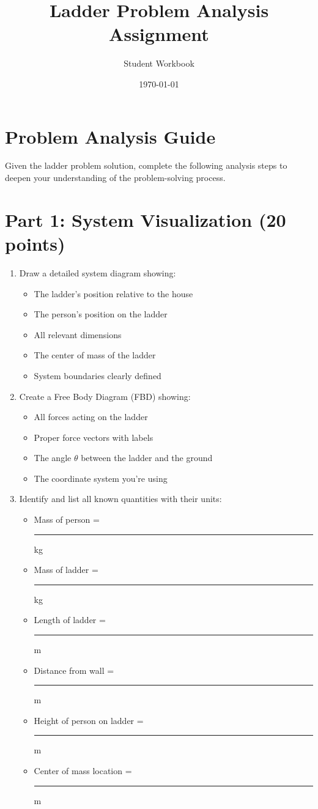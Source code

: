 \documentclass{article}
\title{Ladder Problem Analysis Assignment}
\author{Student Workbook}
\date{\today}
\begin{document}
\maketitle

\section*{Problem Analysis Guide}

Given the ladder problem solution, complete the following analysis steps to deepen your understanding of the problem-solving process.

\section*{Part 1: System Visualization (20 points)}

\begin{enumerate}[label=\arabic*., leftmargin=*]
    \item Draw a detailed system diagram showing:
    \begin{itemize}
        \item The ladder's position relative to the house
        \item The person's position on the ladder
        \item All relevant dimensions
        \item The center of mass of the ladder
        \item System boundaries clearly defined 
    \end{itemize}
    
    \item Create a Free Body Diagram (FBD) showing:
    \begin{itemize}
        \item All forces acting on the ladder
        \item Proper force vectors with labels
        \item The angle $\theta$ between the ladder and the ground
        \item The coordinate system you're using
    \end{itemize}
    
    \item Identify and list all known quantities with their units:
    \begin{itemize}
        \item Mass of person = \rule{2cm}{0.15mm} \si{\kilogram}
        \item Mass of ladder = \rule{2cm}{0.15mm} \si{\kilogram}
        \item Length of ladder = \rule{2cm}{0.15mm} \si{\meter}
        \item Distance from wall = \rule{2cm}{0.15mm} \si{\meter}
        \item Height of person on ladder = \rule{2cm}{0.15mm} \si{\meter}
        \item Center of mass location = \rule{2cm}{0.15mm} \si{\meter}
    \end{itemize}
\end{enumerate}
\end{document}
